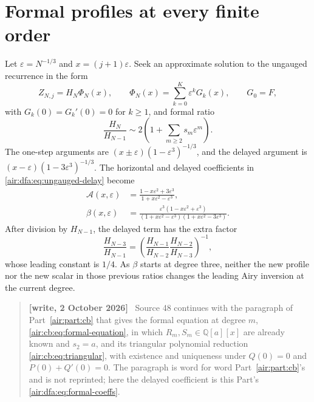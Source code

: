 \documentclass[11pt,letterpaper]{article}
\numberwithin{equation}{section}
\theoremstyle{remark}
\newcommand{\Q}{\mathbb{Q}}
\newcommand{\eps}{\varepsilon}
\newenvironment{writenote}{\par\smallskip\begin{quote}\small\textbf{[write, 2 October 2026]}\ }{\end{quote}\smallskip}
\begin{document}
\section{Formal profiles at every finite order}

Let $\eps=N^{-1/3}$ and $x=(j+1)\eps$. Seek an approximate solution to the
ungauged recurrence in the form
\begin{equation}\label{air:dfa:eq:formal-ansatz}
Z_{N,j}=H_N\Phi_N(x),\qquad
\Phi_N(x)=\sum_{k=0}^{K}\eps^kG_k(x),\qquad G_0=F,
\end{equation}
with $G_k(0)=G_k'(0)=0$ for $k\ge1$, and formal ratio
\begin{equation}\label{air:dfa:eq:formal-ratio}
\frac{H_N}{H_{N-1}}\sim2\left(1+\sum_{m\ge2}s_m\eps^m\right).
\end{equation}
The one-step arguments are $(x\pm\eps)(1-\eps^3)^{-1/3}$, and the delayed
argument is $(x-\eps)(1-3\eps^3)^{-1/3}$. The horizontal and delayed
coefficients in \eqref{air:dfa:eq:ungauged-delay} become
\begin{equation}\label{air:dfa:eq:formal-coeffs}
\begin{aligned}
\mathcal A(x,\eps)&=\frac{1-x\eps^2+3\eps^3}{1+x\eps^2-\eps^3},\\
\beta(x,\eps)&=\frac{\eps^3(1-x\eps^2+\eps^3)}
{(1+x\eps^2-\eps^3)(1+x\eps^2-3\eps^3)}.
\end{aligned}
\end{equation}
After division by $H_{N-1}$, the delayed term has the extra factor
\[
\frac{H_{N-3}}{H_{N-1}}=
\left(\frac{H_{N-1}}{H_{N-2}}\frac{H_{N-2}}{H_{N-3}}\right)^{-1},
\]
whose leading constant is $1/4$. As $\beta$ starts at degree three, neither
the new profile nor the new scalar in those previous ratios changes the
leading Airy inversion at the current degree.

\begin{writenote}
Source 48 continues with the paragraph of Part~\ref{air:part:cb} that gives the formal equation at degree $m$, \eqref{air:cb:eq:formal-equation}, in which $R_m,S_m\in\Q[a][x]$ are already known and $s_2=a$, and its triangular polynomial reduction \eqref{air:cb:eq:triangular}, with existence and uniqueness under $Q(0)=0$ and $P(0)+Q'(0)=0$. The paragraph is word for word Part~\ref{air:part:cb}'s and is not reprinted; here the delayed coefficient is this Part's \eqref{air:dfa:eq:formal-coeffs}.
\end{writenote}
\end{document}
